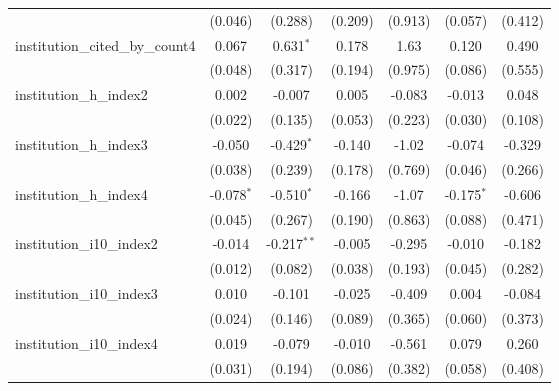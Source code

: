 \begin{tabular}{lcccccc}
                                         & (0.046)        & (0.288)       & (0.209)       & (0.913)       & (0.057)       & (0.412)\\   
   institution\_cited\_by\_count4        & 0.067          & 0.631$^{*}$   & 0.178         & 1.63          & 0.120         & 0.490\\   
                                         & (0.048)        & (0.317)       & (0.194)       & (0.975)       & (0.086)       & (0.555)\\   
   institution\_h\_index2                & 0.002          & -0.007        & 0.005         & -0.083        & -0.013        & 0.048\\   
                                         & (0.022)        & (0.135)       & (0.053)       & (0.223)       & (0.030)       & (0.108)\\   
   institution\_h\_index3                & -0.050         & -0.429$^{*}$  & -0.140        & -1.02         & -0.074        & -0.329\\   
                                         & (0.038)        & (0.239)       & (0.178)       & (0.769)       & (0.046)       & (0.266)\\   
   institution\_h\_index4                & -0.078$^{*}$   & -0.510$^{*}$  & -0.166        & -1.07         & -0.175$^{*}$  & -0.606\\   
                                         & (0.045)        & (0.267)       & (0.190)       & (0.863)       & (0.088)       & (0.471)\\   
   institution\_i10\_index2              & -0.014         & -0.217$^{**}$ & -0.005        & -0.295        & -0.010        & -0.182\\   
                                         & (0.012)        & (0.082)       & (0.038)       & (0.193)       & (0.045)       & (0.282)\\   
   institution\_i10\_index3              & 0.010          & -0.101        & -0.025        & -0.409        & 0.004         & -0.084\\   
                                         & (0.024)        & (0.146)       & (0.089)       & (0.365)       & (0.060)       & (0.373)\\   
   institution\_i10\_index4              & 0.019          & -0.079        & -0.010        & -0.561        & 0.079         & 0.260\\   
                                         & (0.031)        & (0.194)       & (0.086)       & (0.382)       & (0.058)       & (0.408)\\   

\end{tabular}
